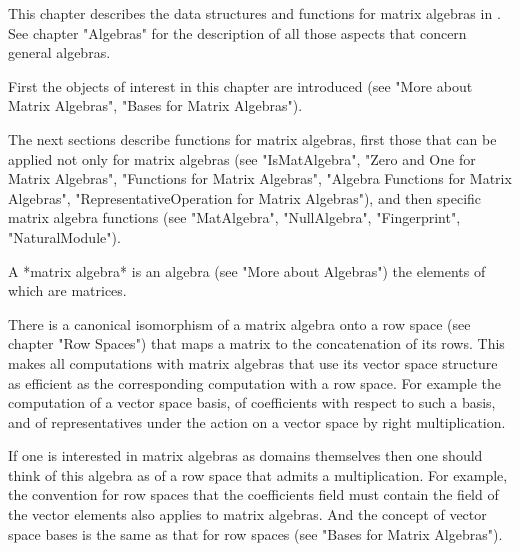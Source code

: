 
This chapter describes the data structures and functions for matrix
algebras in {\GAP}.  See chapter "Algebras" for the description of all
those aspects that concern general algebras.

First the objects of interest in this chapter are introduced (see "More
about Matrix Algebras", "Bases for Matrix Algebras").

The next sections describe functions for matrix algebras, first those
that can be applied not only for matrix algebras (see "IsMatAlgebra",
"Zero and One for Matrix Algebras", "Functions for Matrix Algebras", 
"Algebra Functions for Matrix Algebras", "RepresentativeOperation for
Matrix Algebras"), and then specific matrix algebra functions (see
"MatAlgebra", "NullAlgebra", "Fingerprint", "NaturalModule").


A *matrix algebra* is an algebra (see "More about Algebras") the elements
of which are matrices.

There is a canonical isomorphism of a matrix algebra onto a row space
(see chapter "Row Spaces") that maps a matrix to the concatenation of its
rows.  This makes all computations with matrix algebras that use its
vector space structure as efficient as the corresponding computation with
a row space.  For example the computation of a vector space basis, of
coefficients with respect to such a basis, and of representatives under
the action on a vector space by right multiplication.

If one is interested in matrix algebras as domains themselves then one
should think of this algebra as of a row space that admits a
multiplication.  For example, the convention for row spaces that the
coefficients field must contain the field of the vector elements also
applies to matrix algebras.  And the concept of vector space bases is
the same as that for row spaces (see "Bases for Matrix Algebras").

